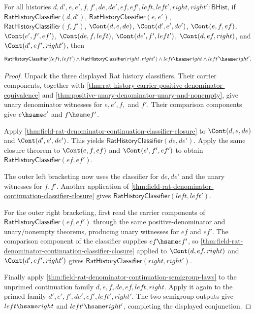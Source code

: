 \begin{theorem}
\label{thm:field-rat-denominator-continuation-associative-classifier-congruence}
For all histories
$d,d',e,e',f,f',de,de',ef,ef',left,left',right,right':\mathsf{BHist}$, if
$\mathsf{RatHistoryClassifier}(d,d')$,
$\mathsf{RatHistoryClassifier}(e,e')$,
$\mathsf{RatHistoryClassifier}(f,f')$,
$\Cont(d,e,de)$, $\Cont(d',e',de')$, $\Cont(e,f,ef)$,
$\Cont(e',f',ef')$, $\Cont(de,f,left)$, $\Cont(de',f',left')$,
$\Cont(d,ef,right)$, and $\Cont(d',ef',right')$, then
$$
\mathsf{RatHistoryClassifier}(left,left')\land
\mathsf{RatHistoryClassifier}(right,right')\land
left\hsame right\land left'\hsame right'.
$$
\end{theorem}
\begin{proof}
Unpack the three displayed Rat history classifiers. Their carrier components,
together with
\autoref{thm:rat-history-carrier-positive-denominator-equivalence} and
\autoref{thm:positive-unary-denominator-unary-and-nonempty}, give unary
denominator witnesses for $e,e',f,$ and $f'$. Their comparison components give
$e\hsame e'$ and $f\hsame f'$.

Apply
\autoref{thm:field-rat-denominator-continuation-classifier-closure} to
$\Cont(d,e,de)$ and $\Cont(d',e',de')$. This yields
$\mathsf{RatHistoryClassifier}(de,de')$. Apply the same closure theorem to
$\Cont(e,f,ef)$ and $\Cont(e',f',ef')$ to obtain
$\mathsf{RatHistoryClassifier}(ef,ef')$.

The outer left bracketing now uses the classifier for $de,de'$ and the unary
witnesses for $f,f'$. Another application of
\autoref{thm:field-rat-denominator-continuation-classifier-closure} gives
$\mathsf{RatHistoryClassifier}(left,left')$.

For the outer right bracketing, first read the carrier components of
$\mathsf{RatHistoryClassifier}(ef,ef')$ through the same positive-denominator
and unary/nonempty theorems, producing unary witnesses for $ef$ and $ef'$. The
comparison component of the classifier supplies $ef\hsame ef'$, so
\autoref{thm:field-rat-denominator-continuation-classifier-closure} applied to
$\Cont(d,ef,right)$ and $\Cont(d',ef',right')$ gives
$\mathsf{RatHistoryClassifier}(right,right')$.

Finally apply
\autoref{thm:field-rat-denominator-continuation-semigroup-laws} to the
unprimed continuation family $d,e,f,de,ef,left,right$. Apply it again to the
primed family $d',e',f',de',ef',left',right'$. The two semigroup outputs give
$left\hsame right$ and $left'\hsame right'$, completing the displayed
conjunction.
\end{proof}

